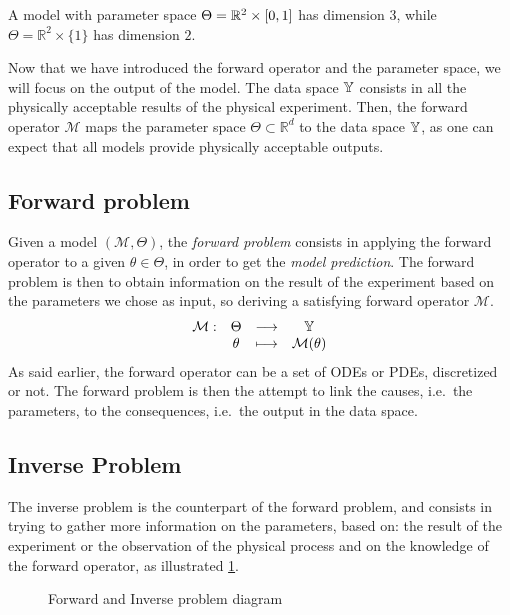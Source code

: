 \documentclass[../../Main_ManuscritThese.tex]{subfiles}
\newcommand\imgpath{/home/victor/acadwriting/Manuscrit/Text/Chapter2/img/}
\begin{document}
\begin{example}
  A model with parameter space $\Theta = \mathbb{R}^2\times \interval{0}{1}$ has dimension $3$, while $\Theta = \mathbb{R}^2 \times \{1\}$ has dimension $2$.
\end{example}
 Now that we have introduced the forward operator and the parameter space, we will focus on the output of the model.
The data space $\mathbb{Y}$ consists in all the physically acceptable results of the physical experiment.
Then, the forward operator $\mathcal{M}$ maps the parameter space $\Theta \subset \mathbb{R}^{d}$ to the data space $\mathbb{Y}$, as one can expect that all models provide physically acceptable outputs.

\subsection{Forward problem}
Given a model $(\mathcal{M}, \Theta)$, the \emph{forward problem} consists in applying the forward operator to a given $\theta \in \Theta$, in order to get the \emph{model prediction}. The forward problem is then to obtain information on the result of the experiment based on the parameters we chose as input, so deriving a satisfying forward operator $\mathcal{M}$.
\begin{equation}
  \begin{array}{cccc}
    \mathcal{M}:& \Theta &\longrightarrow & \mathbb{Y} \\
                & \theta &\longmapsto     & \mathcal{M}(\theta)
  \end{array}
\end{equation}
As said earlier, the forward operator can be a set of ODEs or PDEs, discretized or not. The forward problem is then the attempt to link the causes, i.e.\ the parameters, to the consequences, i.e.\ the output in the data space.

\subsection{Inverse Problem}
The inverse problem is the counterpart of the forward problem, and consists in trying to gather more information on the parameters, based on: the result of the experiment or the observation of the physical process and on the knowledge of the forward operator, as illustrated \cref{fig:inv_problem_pple}.

\begin{figure}[ht]
  \centering
  
  \caption{Forward and Inverse problem diagram}
  \label{fig:inv_problem_pple}
\end{figure}
\end{document}
